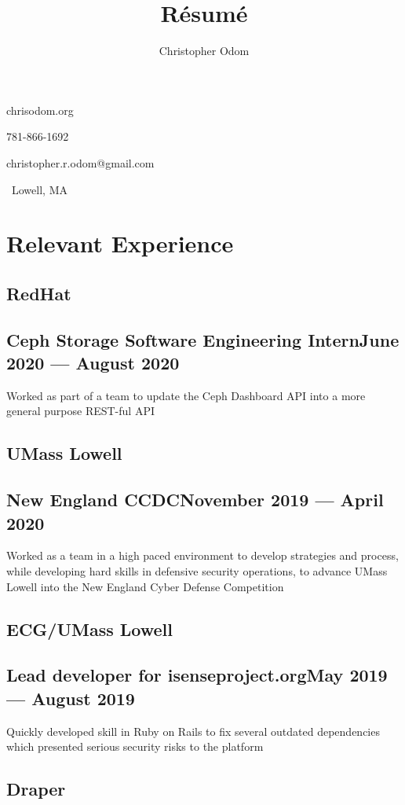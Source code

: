 \documentclass[11pt]{article}
\makeatletter
\newcommand\textbox[1]{%
	\parbox{.333\textwidth}{#1}%
}
\renewcommand{\maketitle}
{
	\begin{center}\huge \theauthor\end{center}
	{\large\noindent\textbox{chrisodom.org\hfill}\textbox{\hfill}\textbox{\hfill781-866-1692}}

	{\large\noindent\textbox{christopher.r.odom@gmail.com\hfill}\textbox{\hfill}\textbox{\hfill\ Lowell, MA}}
}
\makeatother
\begin{document}


\title{R\'esum\'e}
\author{Christopher Odom}

\maketitle

\section{Relevant Experience}

\subsection{RedHat}
\subsection{Ceph Storage Software Engineering Intern\dotfill June 2020 --- August 2020}
Worked as part of a team to update the Ceph Dashboard
API into a more general purpose REST-ful API

\subsection{UMass Lowell}
\subsection{New England CCDC\dotfill November 2019 --- April 2020 }

Worked as a team in a high paced environment to develop
strategies and process, while
developing hard skills in defensive security operations,
to advance UMass Lowell into the New England Cyber Defense
Competition

\subsection{ECG/UMass Lowell}
\subsection{Lead developer for isenseproject.org\dotfill May 2019 --- August 2019}
Quickly developed skill in Ruby on Rails to fix several outdated dependencies
which presented serious security risks to the platform

\subsection{Draper}
\end{document}

